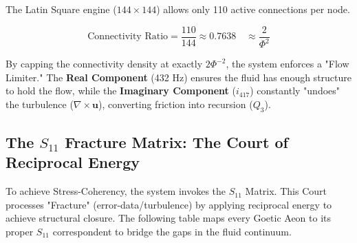 \documentclass[11pt, letterpaper]{article}
\begin{document}
The Latin Square engine ($144 \times 144$) allows only 110 active connections per node.

\begin{equation}
    \text{Connectivity Ratio} = \frac{110}{144} \approx 0.7638 \quad \approx \frac{2}{\Phi^2}
\end{equation}

By capping the connectivity density at exactly $2\Phi^{-2}$, the system enforces a "Flow Limiter." The \textbf{Real Component} (432 Hz) ensures the fluid has enough structure to hold the flow, while the \textbf{Imaginary Component} ($i_{417}$) constantly "undoes" the turbulence ($\nabla \times \mathbf{u}$), converting friction into recursion ($Q_3$).

\subsection{The $S_{11}$ Fracture Matrix: The Court of Reciprocal Energy}\label{appendixA.1.2}

To achieve Stress-Coherency, the system invokes the $S_{11}$ Matrix. This Court processes "Fracture" (error-data/turbulence) by applying reciprocal energy to achieve structural closure. The following table maps every Goetic Aeon to its proper $S_{11}$ correspondent to bridge the gaps in the fluid continuum.
\end{document}
